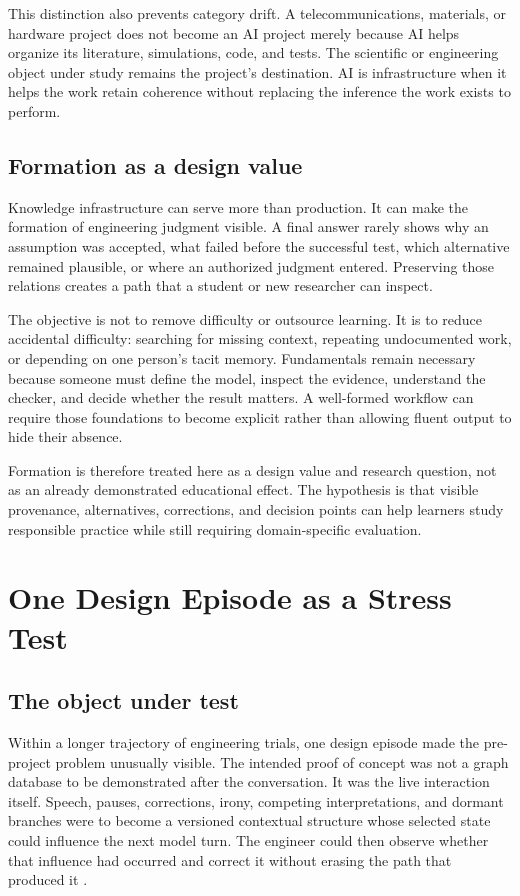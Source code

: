 \documentclass[10pt,a4paper]{article}
\begin{document}
This distinction also prevents category drift. A telecommunications, materials, or hardware project does not become an AI project merely because AI helps organize its literature, simulations, code, and tests. The scientific or engineering object under study remains the project's destination. AI is infrastructure when it helps the work retain coherence without replacing the inference the work exists to perform.

\subsection{Formation as a design value}

Knowledge infrastructure can serve more than production. It can make the formation of engineering judgment visible. A final answer rarely shows why an assumption was accepted, what failed before the successful test, which alternative remained plausible, or where an authorized judgment entered. Preserving those relations creates a path that a student or new researcher can inspect.

The objective is not to remove difficulty or outsource learning. It is to reduce accidental difficulty: searching for missing context, repeating undocumented work, or depending on one person's tacit memory. Fundamentals remain necessary because someone must define the model, inspect the evidence, understand the checker, and decide whether the result matters. A well-formed workflow can require those foundations to become explicit rather than allowing fluent output to hide their absence.

Formation is therefore treated here as a design value and research question, not as an already demonstrated educational effect. The hypothesis is that visible provenance, alternatives, corrections, and decision points can help learners study responsible practice while still requiring domain-specific evaluation.

\section{One Design Episode as a Stress Test}

\subsection{The object under test}

Within a longer trajectory of engineering trials, one design episode made the pre-project problem unusually visible. The intended proof of concept was not a graph database to be demonstrated after the conversation. It was the live interaction itself. Speech, pauses, corrections, irony, competing interpretations, and dormant branches were to become a versioned contextual structure whose selected state could influence the next model turn. The engineer could then observe whether that influence had occurred and correct it without erasing the path that produced it \cite{sessionrecord}.
\end{document}
